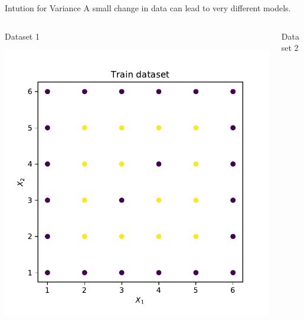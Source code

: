 \documentclass{beamer}
\begin{document}
\begin{frame}{Intution for Variance}
A small change in data can lead to very different models.\\
\vspace{1cm}
\begin{columns}
\begin{column}{0.5\textwidth}{\hspace{1.75cm} Dataset 1}
\begin{center}
\includegraphics[width = \textwidth]{../bias-variance/imgs/dataset-2-train}
\end{center}
\end{column}
\begin{column}{0.5\textwidth}{\hspace{1.75cm} Dataset 2}
\begin{center}

\end{center}
\end{column}
\end{columns}
\end{frame}
\end{document}
